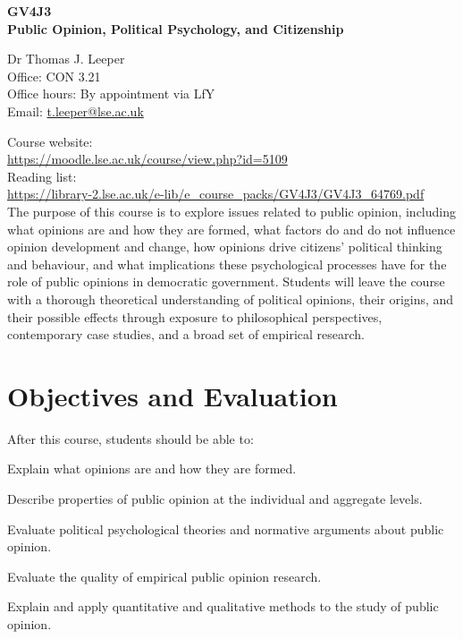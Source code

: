 \documentclass[12pt,a4paper]{article}
\begin{document}
\nobibliography*
\faketableofcontents

\begin{center}
{\Large
\noindent \textbf{GV4J3\\ Public Opinion, Political Psychology, and Citizenship}
}
\end{center}
\vspace{1em}

\noindent
Dr Thomas J. Leeper\\
Office: CON 3.21\\
Office hours: By appointment via LfY\\
Email: \href{mailto:t.leeper@lse.ac.uk}{t.leeper@lse.ac.uk}

\vspace{1em}

\noindent Course website:\\ \url{https://moodle.lse.ac.uk/course/view.php?id=5109}\\
Reading list:\\ \url{https://library-2.lse.ac.uk/e-lib/e_course_packs/GV4J3/GV4J3_64769.pdf}\\

\noindent The purpose of this course is to explore issues related to public opinion, including what opinions are and how they are formed, what factors do and do not influence opinion development and change, how opinions drive citizens' political thinking and behaviour, and what implications these psychological processes have for the role of public opinions in democratic government. Students will leave the course with a thorough theoretical understanding of political opinions, their origins, and their possible effects through exposure to philosophical perspectives, contemporary case studies, and a broad set of empirical research.

\section{Objectives and Evaluation}
After this course, students should be able to:
\begin{enumerate*}
\item Explain what opinions are and how they are formed.
\item Describe properties of public opinion at the individual and aggregate levels.
\item Evaluate political psychological theories and normative arguments about public opinion.
\item Evaluate the quality of empirical public opinion research.
\item Explain and apply quantitative and qualitative methods to the study of public opinion.
\end{enumerate*}
\end{document}
